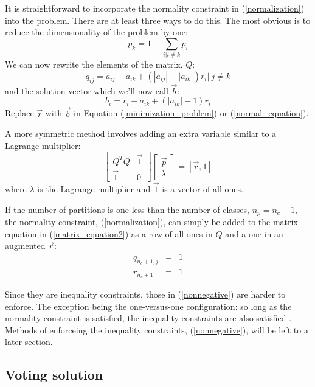 \documentclass{article}
\begin{document}
It is straightforward to incorporate the normality constraint in (\ref{normalization}) into the problem. There are at least three ways to do this. The most
obvious is to reduce the dimensionality of the problem by one:
\begin{equation}
	p_k = 1 - \sum_{i|i \ne k} p_i
\end{equation}
We can now rewrite the elements of the matrix, $Q$:
\begin{equation}
	q_{ij} = a_{ij} - a_{ik} + (|a_{ij}|-|a_{ik}|)r_i | ~ j \ne k
\end{equation}
and the solution vector which we'll now call $\vec b$:
\begin{equation}
	b_i = r_i - a_{ik} + (|a_{ik}| - 1) r_i
\end{equation}
Replace $\vec r$ with $\vec b$ in Equation (\ref{minimization_problem}) or (\ref{normal_equation}).

A more symmetric method involves adding an extra variable similar to
a Lagrange multiplier:
\begin{equation}
	\begin{bmatrix}
		Q^T Q & \vec 1 \\
		\vec 1 & 0
	\end{bmatrix}
	\begin{bmatrix}
		\vec p\\
		\lambda
	\end{bmatrix}
	= [\vec r, 1]
\end{equation}
where $\lambda$ is the Lagrange multiplier and $\vec 1$ is a vector of all ones.

If the number of partitions is one less than the number of classes, $n_p=n_c-1$,
the normality constraint, (\ref{normalization}), can simply be added to the 
matrix equation in (\ref{matrix_equation2}) as a row of all ones in $Q$ and a one in an augmented $\vec r$:
\begin{eqnarray}
	q_{n_c+1,j} & = & 1 \\
	r_{n_c+1} & = & 1
\end{eqnarray}

Since they are inequality constraints, those in (\ref{nonnegative}) are
harder to enforce.
The exception being the one-versus-one configuration: so long as the normality
constraint is satisfied, the inequality constraints are also satisfied
\citep{Wu_etal2004}.
Methods of enforceing the inequality constraints, (\ref{nonnegative}), will
be left to a later section.

\subsection{Voting solution}
\end{document}
